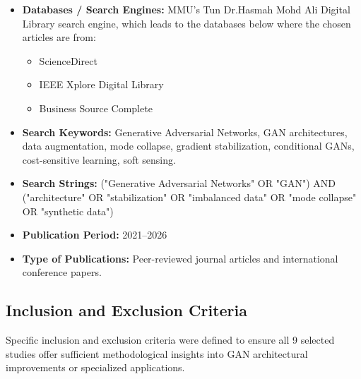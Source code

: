 \documentclass[12pt,a4paper]{article}
\begin{document}
\begin{itemize}
    \item \textbf{Databases / Search Engines:} MMU's Tun Dr.Hasmah Mohd Ali Digital Library search engine, which leads to the databases below where the chosen articles are from:
    \begin{itemize}
        \item ScienceDirect
        \item IEEE Xplore Digital Library
        \item Business Source Complete
    \end{itemize}
    \item \textbf{Search Keywords:} Generative Adversarial Networks, GAN architectures, data augmentation, mode collapse, gradient stabilization, conditional GANs, cost-sensitive learning, soft sensing.
    \item \textbf{Search Strings:} ("Generative Adversarial Networks" OR "GAN") AND ("architecture" OR "stabilization" OR "imbalanced data" OR "mode collapse" OR "synthetic data")
    \item \textbf{Publication Period:} 2021--2026
    \item \textbf{Type of Publications:} Peer-reviewed journal articles and international conference papers.
\end{itemize}
\newpage
\subsection{Inclusion and Exclusion Criteria}

Specific inclusion and exclusion criteria were defined to ensure all 9 selected studies offer sufficient methodological insights into GAN architectural improvements or specialized applications.
\end{document}
